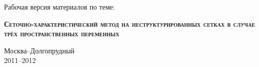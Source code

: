 \begin{titlepage}
\newpage

\begin{center}
\end{center}

\vspace{2em}

\begin{center}
Рабочая версия материалов по теме:
\end{center}

\vspace{5em}

\begin{center}
\textsc{\textbf{Сеточно-характеристический метод на неструктурированных сетках в случае трёх пространственных переменных}}
\end{center}

\vspace{\fill}
\begin{center}
Москва--Долгопрудный\\
2011--2012
\end{center}

\end{titlepage}
